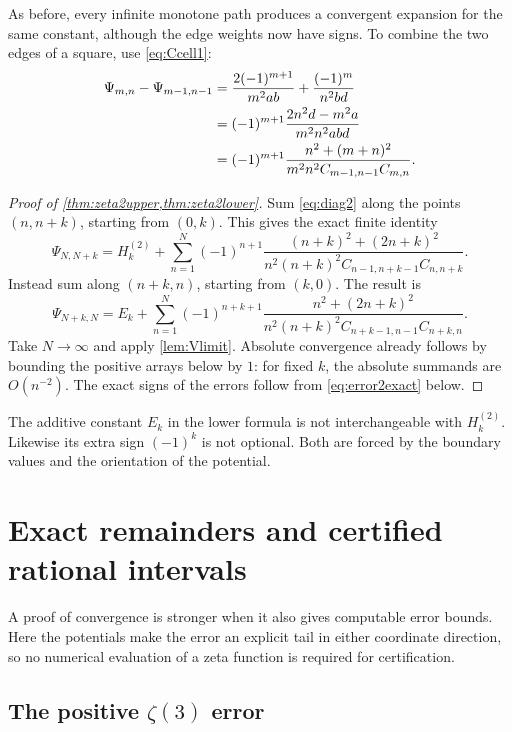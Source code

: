 \documentclass[11pt,letterpaper]{article}
\numberwithin{equation}{section}
\theoremstyle{definition}
\newcommand{\Hh}[2]{H_{#1}^{(#2)}}
\begin{document}
As before, every infinite monotone path produces a convergent expansion
for the same constant, although the edge weights now have signs.
To combine the two edges of a square, use \eqref{eq:Ccell1}:
\begin{align}
 \Psi_{m,n}-\Psi_{m-1,n-1}
 &=\frac{2(-1)^{m+1}}{m^2ab}+\frac{(-1)^m}{n^2bd}\notag\\
 &=(-1)^{m+1}\frac{2n^2d-m^2a}{m^2n^2abd}\notag\\
 &=(-1)^{m+1}
 \frac{n^2+(m+n)^2}{m^2n^2 C_{m-1,n-1}C_{m,n}}.\label{eq:diag2}
\end{align}

\begin{proof}[Proof of \cref{thm:zeta2upper,thm:zeta2lower}]
Sum \eqref{eq:diag2} along the points $(n,n+k)$, starting from $(0,k)$.
This gives the exact finite identity
\begin{equation}\label{eq:finite2upper}
 \Psi_{N,N+k}=\Hh{k}{2}+\sum_{n=1}^{N}(-1)^{n+1}
 \frac{(n+k)^2+(2n+k)^2}
 {n^2(n+k)^2 C_{n-1,n+k-1}C_{n,n+k}}.
\end{equation}
Instead sum along $(n+k,n)$, starting from $(k,0)$. The result is
\begin{equation}\label{eq:finite2lower}
 \Psi_{N+k,N}=E_k+\sum_{n=1}^{N}(-1)^{n+k+1}
 \frac{n^2+(2n+k)^2}
 {n^2(n+k)^2 C_{n+k-1,n-1}C_{n+k,n}}.
\end{equation}
Take $N\to\infty$ and apply \cref{lem:Vlimit}. Absolute convergence
already follows by bounding the positive arrays below by $1$:
for fixed $k$, the absolute summands are $O(n^{-2})$.
The exact signs of the errors follow from \eqref{eq:error2exact} below.
\end{proof}

The additive constant $E_k$ in the lower formula is not interchangeable
with $\Hh{k}{2}$. Likewise its extra sign $(-1)^k$ is not optional.
Both are forced by the boundary values and the orientation of the
potential.

\section{Exact remainders and certified rational intervals}\label{sec:errors}

A proof of convergence is stronger when it also gives computable error
bounds. Here the potentials make the error an explicit tail in either
coordinate direction, so no numerical evaluation of a zeta function is
required for certification.

\subsection{The positive \texorpdfstring{$\zeta(3)$}{zeta(3)} error}
\end{document}
